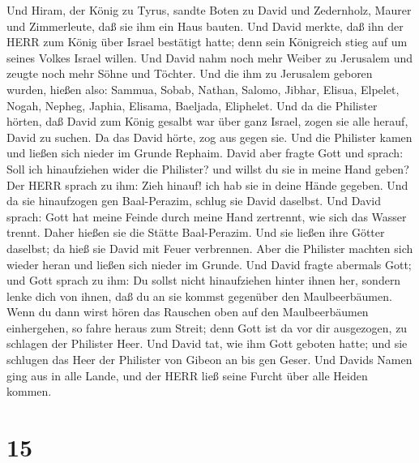  Und Hiram, der König zu Tyrus, sandte Boten zu David und
Zedernholz, Maurer und Zimmerleute, daß sie ihm ein Haus bauten.
 Und David merkte, daß ihn der HERR zum König über Israel
bestätigt hatte; denn sein Königreich stieg auf um seines Volkes Israel
willen.  Und David nahm noch mehr Weiber zu Jerusalem und
zeugte noch mehr Söhne und Töchter.  Und die ihm zu
Jerusalem geboren wurden, hießen also: Sammua, Sobab, Nathan, Salomo,
 Jibhar, Elisua, Elpelet,  Nogah, Nepheg,
Japhia,  Elisama, Baeljada, Eliphelet.  Und da
die Philister hörten, daß David zum König gesalbt war über ganz Israel,
zogen sie alle herauf, David zu suchen. Da das David hörte, zog aus
gegen sie.  Und die Philister kamen und ließen sich nieder
im Grunde Rephaim.  David aber fragte Gott und sprach: Soll
ich hinaufziehen wider die Philister? und willst du sie in meine Hand
geben? Der HERR sprach zu ihm: Zieh hinauf! ich hab sie in deine Hände
gegeben.  Und da sie hinaufzogen gen Baal-Perazim, schlug
sie David daselbst. Und David sprach: Gott hat meine Feinde durch meine
Hand zertrennt, wie sich das Wasser trennt. Daher hießen sie die Stätte
Baal-Perazim.  Und sie ließen ihre Götter daselbst; da hieß
sie David mit Feuer verbrennen.  Aber die Philister machten
sich wieder heran und ließen sich nieder im Grunde.  Und
David fragte abermals Gott; und Gott sprach zu ihm: Du sollst nicht
hinaufziehen hinter ihnen her, sondern lenke dich von ihnen, daß du an
sie kommst gegenüber den Maulbeerbäumen.  Wenn du dann
wirst hören das Rauschen oben auf den Maulbeerbäumen einhergehen, so
fahre heraus zum Streit; denn Gott ist da vor dir ausgezogen, zu
schlagen der Philister Heer.  Und David tat, wie ihm Gott
geboten hatte; und sie schlugen das Heer der Philister von Gibeon an bis
gen Geser.  Und Davids Namen ging aus in alle Lande, und
der HERR ließ seine Furcht über alle Heiden kommen.

\hypertarget{section-14}{%
\section{15}\label{section-14}}


